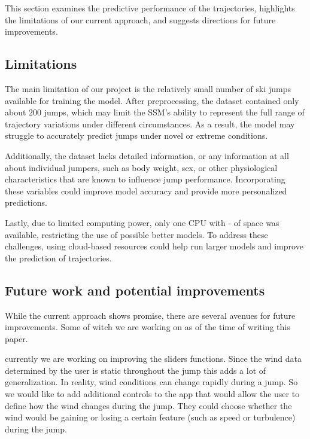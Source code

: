 \documentclass[sigconf,natbib=false, language=english]{acmart}
\begin{document}


This section examines the predictive performance of the trajectories, highlights the limitations of our current approach, and suggests directions for future improvements.

\subsection{Limitations}

The main limitation of our project is the relatively small number of ski jumps available for training the model. After preprocessing, the dataset contained only about $200$ jumps, which may limit the SSM's ability to represent the full range of trajectory variations under different circumstances. As a result, the model may struggle to accurately predict jumps under novel or extreme conditions.

Additionally, the dataset lacks detailed information, or any information at all about individual jumpers, such as body weight, sex, or other physiological characteristics that are known to influence jump performance. Incorporating these variables could improve model accuracy and provide more personalized predictions.

Lastly, due to limited computing power, only one CPU with - of space was available, restricting the use of possible better models. To address these challenges, using cloud-based resources could help run larger models and improve the prediction of trajectories.

\subsection{Future work and potential improvements}

While the current approach shows promise, there are several avenues for future
improvements. Some of witch we are working on as of the time of writing this paper.

currently we are working on improving the sliders functions. Since the wind data 
determined by the user is static throughout the jump this adds a lot of generalization.
In reality, wind conditions can change rapidly during a jump. So we would like to
add additional controls to the app that would allow the user to define how the wind changes
during the jump. They could choose whether the wind would be gaining or losing a certain feature (such as speed or turbulence) during the jump.
\end{document}
